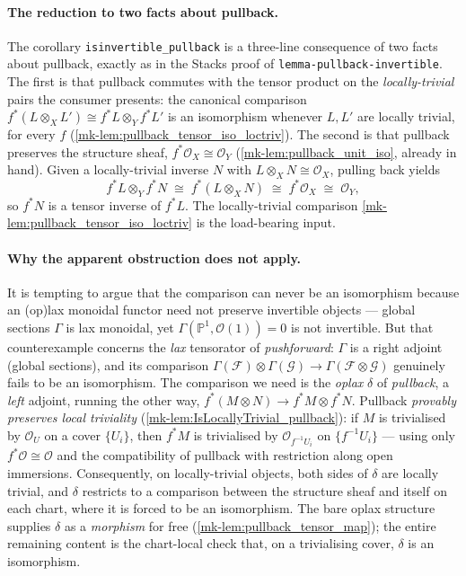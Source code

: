 \paragraph{The reduction to two facts about pullback.} The corollary
\texttt{isinvertible\_pullback} is a three-line consequence of two facts about
pullback, exactly as in the Stacks proof of \texttt{lemma-pullback-invertible}. The
first is that pullback commutes with the tensor product on the \emph{locally-trivial}
pairs the consumer presents: the canonical comparison
\(f^*(L \otimes_X L') \cong f^*L \otimes_Y f^*L'\) is an isomorphism whenever
\(L, L'\) are locally trivial, for every \(f\)
(\ref{mk-lem:pullback_tensor_iso_loctriv}). The second is that pullback preserves the
structure sheaf, \(f^*\mathcal{O}_X \cong \mathcal{O}_Y\)
(\ref{mk-lem:pullback_unit_iso}, already in hand). Given a locally-trivial inverse
\(N\) with \(L \otimes_X N \cong \mathcal{O}_X\), pulling back yields
\[
  f^*L \otimes_Y f^*N
    \;\cong\; f^*(L \otimes_X N)
    \;\cong\; f^*\mathcal{O}_X
    \;\cong\; \mathcal{O}_Y,
\]
so \(f^*N\) is a tensor inverse of \(f^*L\). The locally-trivial comparison
\ref{mk-lem:pullback_tensor_iso_loctriv} is the load-bearing input.

\paragraph{Why the apparent obstruction does not apply.} It is tempting to argue that
the comparison can never be an isomorphism because an (op)lax monoidal functor need
not preserve invertible objects --- global sections \(\Gamma\) is lax monoidal, yet
\(\Gamma(\mathbb{P}^1, \mathcal{O}(1)) = 0\) is not invertible. But that
counterexample concerns the \emph{lax} tensorator of \emph{pushforward}: \(\Gamma\)
is a right adjoint (global sections), and its comparison
\(\Gamma(\mathcal{F}) \otimes \Gamma(\mathcal{G}) \to \Gamma(\mathcal{F} \otimes
\mathcal{G})\) genuinely fails to be an isomorphism. The comparison we need is the
\emph{oplax} \(\delta\) of \emph{pullback}, a \emph{left} adjoint, running the other
way, \(f^*(M \otimes N) \to f^*M \otimes f^*N\). Pullback \emph{provably preserves
local triviality} (\ref{mk-lem:IsLocallyTrivial_pullback}): if \(M\) is trivialised
by \(\mathcal{O}_U\) on a cover \(\{U_i\}\), then \(f^*M\) is trivialised by
\(\mathcal{O}_{f^{-1}U_i}\) on \(\{f^{-1}U_i\}\) --- using only
\(f^*\mathcal{O} \cong \mathcal{O}\) and the compatibility of pullback with
restriction along open immersions. Consequently, on locally-trivial objects, both
sides of \(\delta\) are locally trivial, and \(\delta\) restricts to a comparison
between the structure sheaf and itself on each chart, where it is forced to be an
isomorphism. The bare oplax structure supplies \(\delta\) as a \emph{morphism} for
free (\ref{mk-lem:pullback_tensor_map}); the entire remaining content is the
chart-local check that, on a trivialising cover, \(\delta\) is an isomorphism.

